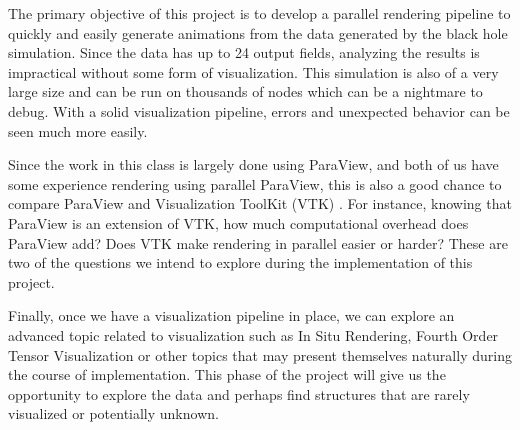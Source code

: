The primary objective of this project is to develop a parallel rendering pipeline to quickly and easily generate animations from the data generated by the black hole simulation. Since the data has up to 24 output fields, analyzing the results is impractical without some form of visualization. This simulation is also of a very large size and can be run on thousands of nodes which can be a nightmare to debug. With a solid visualization pipeline, errors and unexpected behavior can be seen much more easily.

Since the work in this class is largely done using ParaView, and both of us have some experience rendering using parallel ParaView, this is also a good chance to compare ParaView and Visualization ToolKit (VTK) \cite{vtk}. For instance, knowing that ParaView is an extension of VTK, how much computational overhead does ParaView add? Does VTK make rendering in parallel easier or harder? These are two of the questions we intend to explore during the implementation of this project.

Finally, once we have a visualization pipeline in place, we can explore an advanced topic related to visualization such as In Situ Rendering, Fourth Order Tensor Visualization or other topics that may present themselves naturally during the course of implementation. This phase of the project will give us the opportunity to explore the data and perhaps find structures that are rarely visualized or potentially unknown.